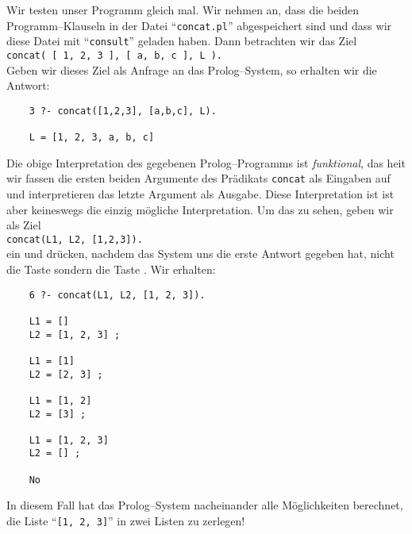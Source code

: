 Wir testen unser Programm gleich mal.  Wir nehmen an, dass die beiden Programm--Klauseln in der Datei
``\texttt{concat.pl}'' abgespeichert sind und dass wir diese Datei mit ``\texttt{consult}'' geladen haben.
Dann betrachten wir das Ziel \\[0.1cm]
\hspace*{1.3cm} \texttt{concat( [ 1, 2, 3 ], [ a, b, c ], L ).} \\[0.1cm]
Geben wir dieses Ziel als Anfrage an das Prolog--System, so erhalten wir die Antwort:
\begin{verbatim}
    3 ?- concat([1,2,3], [a,b,c], L).

    L = [1, 2, 3, a, b, c] 
\end{verbatim}
Die obige Interpretation des gegebenen Prolog--Programms ist \emph{funktional}, das hei\3t 
wir fassen die ersten beiden Argumente des Pr\"{a}dikats \texttt{concat} als Eingaben auf und 
interpretieren das letzte Argument als Ausgabe.  Diese Interpretation ist ist aber keineswegs die 
einzig m\"{o}gliche Interpretation.  Um das zu sehen, geben wir als Ziel \\[0.1cm]
\hspace*{1.3cm} \texttt{concat(L1, L2, [1,2,3]).} \\[0.1cm]
ein und dr\"{u}cken, nachdem das System uns die erste Antwort gegeben hat, nicht die Taste 
 sondern die Taste \fbox{\texttt{;}}.  Wir erhalten:
\begin{verbatim}
    6 ?- concat(L1, L2, [1, 2, 3]).

    L1 = []
    L2 = [1, 2, 3] ;

    L1 = [1]
    L2 = [2, 3] ;

    L1 = [1, 2]
    L2 = [3] ;

    L1 = [1, 2, 3]
    L2 = [] ;

    No
\end{verbatim}
In diesem Fall hat das Prolog--System nacheinander alle M\"{o}glichkeiten berechnet, die 
Liste ``\texttt{[1, 2, 3]}'' in zwei Listen zu zerlegen!

